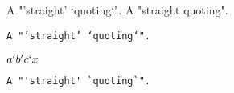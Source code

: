 \documentclass[version=3.21, pagesize, twoside=off, bibliography=totoc, DIV=calc, fontsize=12pt, a4paper]{scrartcl}
\begin{document}
A "'straight' `quoting`". A "\textquotesingle{}straight\textquotesingle{} \textasciigrave{}quoting\textasciigrave{}". 

\texttt{A "'straight' `quoting`".} 

$a 'b' c`x$ 

\verb|A "'straight' `quoting`".|

%
%
%
%
%


\end{document}

